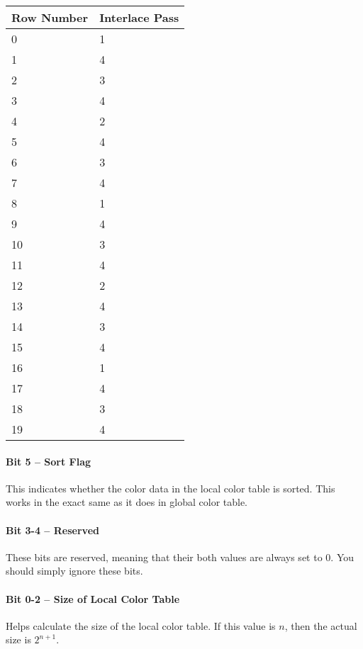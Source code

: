 \begin{table}
  \centering
  \begin{tabular}{ll}
    \toprule
    Row Number & Interlace Pass \\
    \midrule
    0 & 1 \\
    1 & 4 \\
    2 & 3 \\
    3 & 4 \\
    4 & 2 \\
    5 & 4 \\
    6 & 3 \\
    7 & 4 \\
    8 & 1 \\
    9 & 4 \\
    10 & 3 \\
    11 & 4 \\
    12 & 2 \\
    13 & 4 \\
    14 & 3 \\
    15 & 4 \\
    16 & 1 \\
    17 & 4 \\
    18 & 3 \\
    19 & 4 \\
    \bottomrule
  \end{tabular}
  \caption{}
  \label{tab:gif-interlacing}
\end{table}

\paragraph{Bit 5 -- Sort Flag}

This indicates whether the color data in the local color table is
sorted. This works in the exact same as it does in global color
table.

\paragraph{Bit 3-4 -- Reserved}

These bits are reserved, meaning that their both values are always set
to $0$. You should simply ignore these bits.

\paragraph{Bit 0-2 -- Size of Local Color Table}

Helps calculate the size of the local color table. If this value is
$n$, then the actual size is $2^{n + 1}$.

